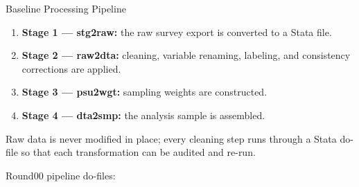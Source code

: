 \begin{procbox}{Baseline Processing Pipeline}
\begin{enumerate}
  \item \textbf{Stage 1 --- stg2raw:} the raw survey export is converted to a
        Stata  file.
  \item \textbf{Stage 2 --- raw2dta:} cleaning, variable renaming, labeling, and
        consistency corrections are applied.
  \item \textbf{Stage 3 --- psu2wgt:} sampling weights are constructed.
  \item \textbf{Stage 4 --- dta2smp:} the analysis sample is assembled.
\end{enumerate}
\end{procbox}

Raw data is never modified in place; every cleaning step runs through a Stata
do-file so that each transformation can be audited and re-run.

\begin{refbox}
Round00 pipeline do-files:\\
\\
\\
\\
\\
\end{refbox}
